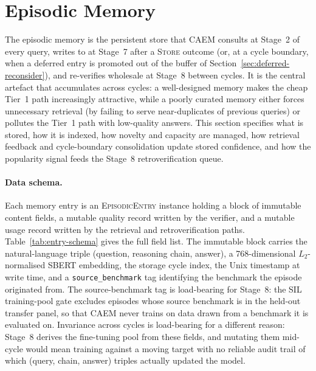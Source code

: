 \section{Episodic Memory}
\label{sec:memory}

The episodic memory is the persistent store that CAEM consults at Stage~2 of every query, writes to at Stage~7 after a \textsc{Store} outcome (or, at a cycle boundary, when a deferred entry is promoted out of the buffer of Section~\ref{sec:deferred-reconsider}), and re-verifies wholesale at Stage~8 between cycles. It is the central artefact that accumulates across cycles: a well-designed memory makes the cheap Tier~1 path increasingly attractive, while a poorly curated memory either forces unnecessary retrieval (by failing to serve near-duplicates of previous queries) or pollutes the Tier~1 path with low-quality answers. This section specifies what is stored, how it is indexed, how novelty and capacity are managed, how retrieval feedback and cycle-boundary consolidation update stored confidence, and how the popularity signal feeds the Stage~8 retroverification queue.

\paragraph{Data schema.}
Each memory entry is an \textsc{EpisodicEntry} instance holding a block of immutable content fields, a mutable quality record written by the verifier, and a mutable usage record written by the retrieval and retroverification paths. Table~\ref{tab:entry-schema} gives the full field list. The immutable block carries the natural-language triple (question, reasoning chain, answer), a 768-dimensional $L_{2}$-normalised SBERT embedding, the storage cycle index, the Unix timestamp at write time, and a \texttt{source\_benchmark} tag identifying the benchmark the episode originated from. The source-benchmark tag is load-bearing for Stage~8: the SIL training-pool gate excludes episodes whose source benchmark is in the held-out transfer panel, so that CAEM never trains on data drawn from a benchmark it is evaluated on. Invariance across cycles is load-bearing for a different reason: Stage~8 derives the fine-tuning pool from these fields, and mutating them mid-cycle would mean training against a moving target with no reliable audit trail of which (query, chain, answer) triples actually updated the model.

